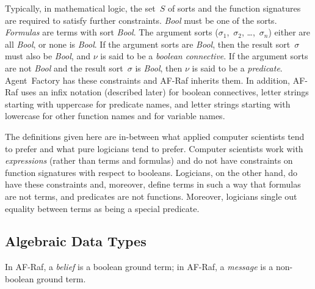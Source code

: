 \documentclass[a4paper,12pt,oneside,fleqn]{book} %
\newcommand{\rg}[1]{\marginpar{\tiny\raggedright\textcolor{blue}{\bf rg:} #1}}
\renewcommand{\rg}{}
\begin{document}
Typically, in mathematical logic, the set~$S$ of sorts and the function
signatures are required to satisfy further constraints. \textit{Bool} must
be one of the sorts. \emph{Formulas} are terms with sort \textit{Bool}.
The argument sorts ($\sigma_1$,~$\sigma_2$, \dots,~$\sigma_n$) either are
all \textit{Bool}, or none is \textit{Bool}.  If the argument sorts are
\textit{Bool}, then the result sort~$\sigma$ must also be \textit{Bool},
and $\nu$ is said to be a \emph{boolean connective}.  If the argument sorts
are not \textit{Bool} and the result sort~$\sigma$ is \textit{Bool}, then
$\nu$ is said to be a \emph{predicate}.  Agent~Factory has these
constraints and AF-Raf inherits them. In addition, AF-Raf uses an infix
notation (described later) for boolean connectives, letter strings starting
with uppercase for predicate names, and letter strings starting with
lowercase for other function names and for variable names.

\begin{remark}
The definitions given here are in-between what applied computer scientists
tend to prefer and what pure logicians tend to prefer.  Computer scientists
work with \emph{expressions} (rather than terms and formulas) and do not
have constraints on function signatures with respect to booleans.
Logicians, on the other hand, do have these constraints and, moreover,
define terms in such a way that formulas are not terms, and predicates are
not functions. Moreover, logicians single out equality between terms as
being a special predicate.
\end{remark}

\subsection{Algebraic Data Types} %

In AF-Raf, a \emph{belief} is a boolean ground term; in AF-Raf, a
\emph{message} is a non-boolean ground term.
\end{document}
